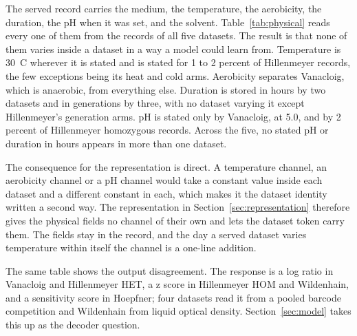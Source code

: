 The served record carries the medium, the temperature, the aerobicity, the duration, the pH
when it was set, and the solvent. Table~\ref{tab:physical} reads every one of them from the
records of all five datasets. The result is that none of them varies inside a dataset in a
way a model could learn from. Temperature is 30~C wherever it is stated and is stated for 1
to 2 percent of Hillenmeyer records, the few exceptions being its heat and cold arms.
Aerobicity separates Vanacloig, which is anaerobic, from everything else. Duration is stored
in hours by two datasets and in generations by three, with no dataset varying it except
Hillenmeyer's generation arms. pH is stated only by Vanacloig, at 5.0, and by 2 percent of
Hillenmeyer homozygous records. Across the five, no stated pH or duration in hours appears in
more than one dataset.

\begin{table}[htbp]
\centering
\footnotesize
\caption{The physical and medium environment fields of every served record, by dataset. A
cell lists the distinct stated values; where fewer than all records state one, the share that
do is given.}
\label{tab:physical}

\end{table}

The consequence for the representation is direct. A temperature channel, an aerobicity
channel or a pH channel would take a constant value inside each dataset and a different
constant in each, which makes it the dataset identity written a second way. The representation
in Section~\ref{sec:representation} therefore gives the physical fields no channel of their own
and lets the dataset token carry them. The fields stay in the record, and the day a served
dataset varies temperature within itself the channel is a one-line addition.

The same table shows the output disagreement. The response is a log ratio in Vanacloig and
Hillenmeyer HET, a z score in Hillenmeyer HOM and Wildenhain, and a sensitivity score in
Hoepfner; four datasets read it from a pooled barcode competition and Wildenhain from liquid
optical density. Section~\ref{sec:model} takes this up as the decoder question.
